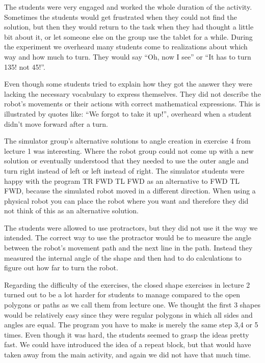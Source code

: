 \bigskip\noindent
The students were very engaged and worked the whole duration of the activity. Sometimes the students would get frustrated when they could not find the solution, but then they would return to the task when they had thought a little bit about it, or let someone else on the group use the tablet for a while. During the experiment we overheard many students come to realizations about which way and how much to turn. They would say ``Oh, now I see'' or ``It has to turn 135! not 45!''. 

\bigskip\noindent
Even though some students tried to explain how they got the answer they were lacking the necessary vocabulary to express themselves. They did not describe the robot's movements or their actions with correct mathematical expressions. This is illustrated by quotes like: ``We forgot to take it up!'', overheard when a student didn't move forward after a turn. 

\bigskip\noindent
The simulator group's alternative solutions to angle creation in exercise 4 from lecture 1 was interesting. Where the robot group could not come up with a new solution or eventually understood that they needed to use the outer angle and turn right instead of left or left instead of right. The simulator students were happy with the program TR FWD TL FWD as an alternative to FWD TL FWD, because the simulated robot moved in a different direction. When using a physical robot you can place the robot where you want and therefore they did not think of this as an alternative solution.

\bigskip\noindent
The students were allowed to use protractors, but they did not use it the way we intended. The correct way to use the protractor would be to measure the angle between the robot's movement path and the next line in the path. Instead they measured the internal angle of the shape and then had to do calculations to figure out how far to turn the robot.

\bigskip\noindent
Regarding the difficulty of the exercises, the closed shape exercises in lecture 2 turned out to be a lot harder for students to manage compared to the open polygons or paths as we call them from lecture one. We thought the first 3 shapes would be relatively easy since they were regular polygons in which all sides and angles are equal. The program you have to make is merely the same step 3,4 or 5 times. Even though it was hard, the students seemed to grasp the ideas pretty fast. We could have introduced the idea of a repeat block, but that would have taken away from the main activity, and again we did not have that much time.